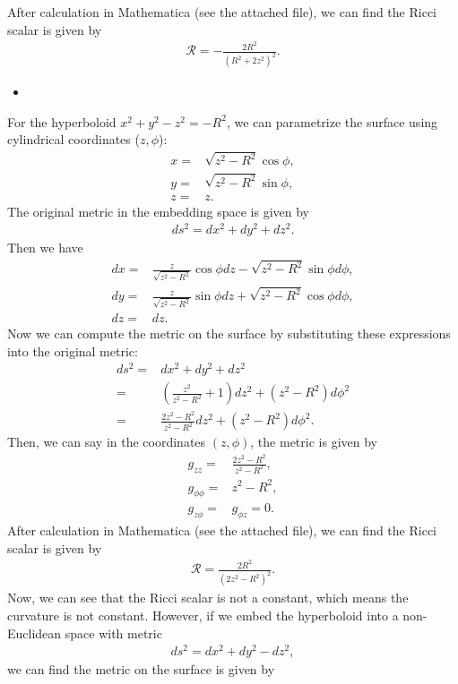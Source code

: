 After calculation in Mathematica (see the attached file), we can find the Ricci scalar is given by
\begin{align}
    \mathcal{R}=-\frac{2R^2}{(R^2+2z^2)^2}.
\end{align}
\begin{itemize}
    \item [(b)]
\end{itemize}
For the hyperboloid $x^2+y^2-z^2=-R^2$, we can parametrize the surface using cylindrical coordinates ($z, \phi$):
\begin{align}
    x=& \sqrt{z^2-R^2} \cos\phi,\\
    y=& \sqrt{z^2-R^2} \sin\phi,\\
    z=&z.
\end{align} 
The original metric in the embedding space is given by
\begin{align}
    ds^2=dx^2+dy^2+dz^2.
\end{align} Then we have 
\begin{align}   
    dx=& \frac{z}{\sqrt{z^2-R^2}} \cos\phi dz - \sqrt{z^2-R^2} \sin\phi d\phi,\\
    dy=& \frac{z}{\sqrt{z^2-R^2}}\sin\phi dz + \sqrt{z^2-R^2} \cos\phi d\phi,\\
    dz=&dz.
\end{align}
Now we can compute the metric on the surface by substituting these expressions into the original metric:
\begin{align}
    ds^2=&dx^2+dy^2+dz^2\\
    =&\left(\frac{z^2}{z^2-R^2}+1\right)dz^2+(z^2-R^2)d\phi^2\\ 
    =&\frac{2z^2-R^2}{z^2-R^2}dz^2+(z^2-R^2)d\phi^2.
\end{align}
Then, we can say in the coordinates $(z, \phi)$, the metric is given by
\begin{align}
    g_{zz}=&\frac{2z^2-R^2}{z^2-R^2},\\
    g_{\phi\phi}=&z^2-R^2,\\
    g_{z\phi}=&g_{\phi z}=0.
\end{align}
After calculation in Mathematica (see the attached file), we can find the Ricci scalar is given by
\begin{align}
    \mathcal{R}=\frac{2R^2}{(2z^2-R^2)^2}.
\end{align}
Now, we can see that the Ricci scalar is not a constant, which means the curvature is not constant. However, if we embed the hyperboloid into a non-Euclidean space with metric
\begin{align}
    ds^2=dx^2+dy^2-dz^2,
\end{align}we can find the metric on the surface is given by
